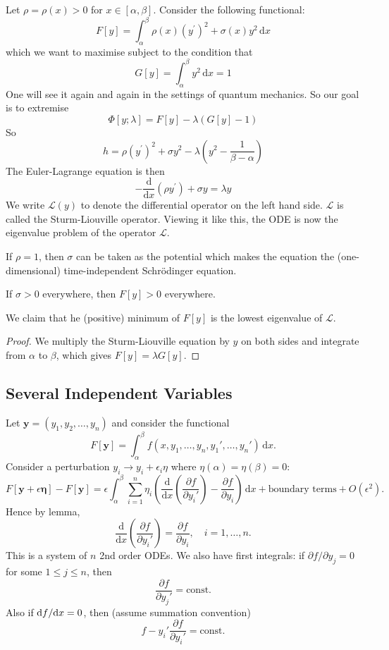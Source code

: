 \documentclass[a4paper]{article}
\begin{document}
\begin{example}\label{sturm-liouville}
    Let $\rho=\rho(x)>0$ for $x\in [\alpha,\beta]$.
    Consider the following functional:
    $$F[y]=\int_\alpha^\beta\rho(x)(y^\prime)^2+\sigma(x)y^2\,\mathrm dx$$
    which we want to maximise subject to the condition that
    $$G[y]=\int_\alpha^\beta y^2\,\mathrm dx=1$$
    One will see it again and again in the settings of quantum mechanics.
    So our goal is to extremise
    $$\Phi[y;\lambda]=F[y]-\lambda(G[y]-1)$$
    So
    $$h=\rho(y^\prime)^2+\sigma y^2-\lambda\left( y^2-\frac{1}{\beta-\alpha} \right)$$
    The Euler-Lagrange equation is then
    $$-\frac{\mathrm d}{\mathrm dx}(\rho y^\prime)+\sigma y=\lambda y$$
    We write $\mathcal L(y)$ to denote the differential operator on the left hand side.
    $\mathcal L$ is called the Sturm-Liouville operator.
    Viewing it like this, the ODE is now the eigenvalue problem of the operator $\mathcal L$.
\end{example}
\begin{remark}
    If $\rho=1$, then $\sigma$ can be taken as the potential which makes the equation the (one-dimensional) time-independent Schr\"odinger equation.
\end{remark}
If $\sigma>0$ everywhere, then $F[y]>0$ everywhere.
\begin{claim}
    We claim that he (positive) minimum of $F[y]$ is the lowest eigenvalue of $\mathcal L$.
\end{claim}
\begin{proof}
    We multiply the Sturm-Liouville equation by $y$ on both sides and integrate from $\alpha$ to $\beta$, which gives $F[y]=\lambda G[y]$.
\end{proof}

\subsection{Several Independent Variables}
Let $ \mathbf{y}=(y_1,y_2,\dots,y_n) $ and consider the functional 
\[
    F[\mathbf{y}] = \int_{\alpha}^{\beta} f(x,y_1,\dots,y_n, y_1',\dots,y_n') \,\mathrm{d}x.
\]
Consider a perturbation $ y_i \to y_i + \epsilon_i \eta $ where $ \eta(\alpha)=\eta(\beta)=0 $:
\[
    F[\mathbf{y}+\epsilon \boldsymbol{\eta}] - F[\mathbf{y}] = \epsilon\int_{\alpha}^{\beta} \sum_{i=1}^{n} \eta_i\left( \frac{\mathrm{d}}{\mathrm{d}x}\left( \frac{\partial f}{\partial y_i'}  \right) -\frac{\partial f}{\partial y_i} \right)  \,\mathrm{d}x + \text{boundary terms} + O(\epsilon^2).
\]
Hence by lemma, 
\[
    \frac{\mathrm{d}}{\mathrm{d}x}\left( \frac{\partial f}{\partial y_i'}  \right) = \frac{\partial f}{\partial y_i},\quad i=1,\dots,n.  
\]
This is a system of $n$ 2nd order ODEs. We also have first integrals: if $ \partial f/\partial y_j=0  $ for some $ 1\le j\le n $, then 
\[
    \frac{\partial f}{\partial y_j'}=\text{const}. 
\]
Also if $ \mathrm{d} f / \mathrm{d} x = 0 $, then (assume summation convention)
\[
    f - y_i' \frac{\partial f}{\partial y_i'}= \text{const}. 
\]
\end{document}
